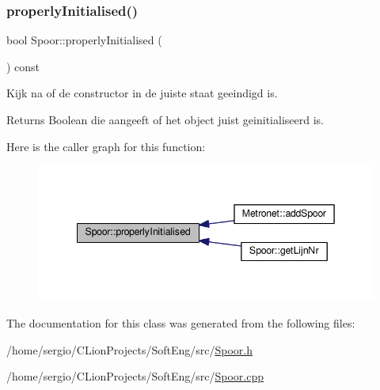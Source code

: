 \subsubsection{\texorpdfstring{properly\+Initialised()}{properlyInitialised()}}
{\footnotesize\ttfamily bool Spoor\+::properly\+Initialised (\begin{DoxyParamCaption}{ }\end{DoxyParamCaption}) const}



Kijk na of de constructor in de juiste staat geeindigd is. 

\begin{DoxyReturn}{Returns}
Boolean die aangeeft of het object juist geinitialiseerd is. 
\end{DoxyReturn}
Here is the caller graph for this function\+:
\nopagebreak
\begin{figure}[H]
\begin{center}
\leavevmode
\includegraphics[width=342pt]{class_spoor_a1eb7c54228676cdb7c8620104e063a3c_icgraph}
\end{center}
\end{figure}


The documentation for this class was generated from the following files\+:\begin{DoxyCompactItemize}
\item 
/home/sergio/\+C\+Lion\+Projects/\+Soft\+Eng/src/\hyperlink{_spoor_8h}{Spoor.\+h}\item 
/home/sergio/\+C\+Lion\+Projects/\+Soft\+Eng/src/\hyperlink{_spoor_8cpp}{Spoor.\+cpp}\end{DoxyCompactItemize}

